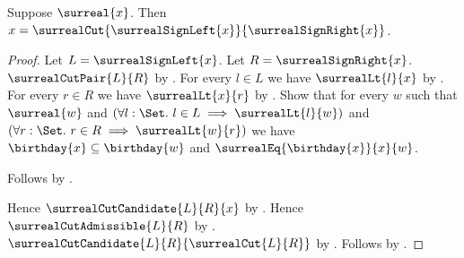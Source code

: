 \begin{theorem}\label{surreal_sign_cut_equation}
    Suppose $\surreal{x}$.
    Then $x=\surrealCut{\surrealSignLeft{x}}{\surrealSignRight{x}}$.
\end{theorem}
\begin{proof}
    Let $L=\surrealSignLeft{x}$.
    Let $R=\surrealSignRight{x}$.
    $\surrealCutPair{L}{R}$ by .
    For every $l\in L$ we have $\surrealLt{l}{x}$
        by .
    For every $r\in R$ we have $\surrealLt{x}{r}$
        by .
    Show that for every $w$ such that $\surreal{w}$ and
        $(\forall l:\Set.\ l\in L\implies\surrealLt{l}{w})$ and
        $(\forall r:\Set.\ r\in R\implies\surrealLt{w}{r})$ we have
        $\birthday{x}\subseteq\birthday{w}$ and
        $\surrealEq{\birthday{x}}{x}{w}$.
    \begin{subproof}
        Follows by .
    \end{subproof}
    Hence $\surrealCutCandidate{L}{R}{x}$
        by .
    Hence $\surrealCutAdmissible{L}{R}$
        by .
    $\surrealCutCandidate{L}{R}{\surrealCut{L}{R}}$
        by .
    Follows by .
\end{proof}

